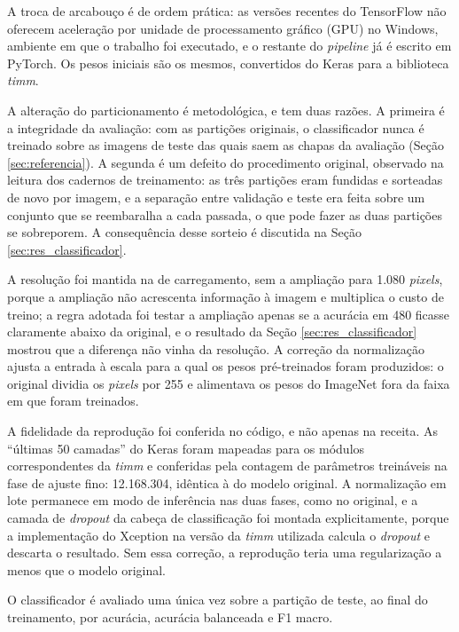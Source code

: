 A troca de arcabouço é de ordem prática: as versões recentes do TensorFlow não oferecem aceleração por unidade de processamento gráfico (GPU) no Windows, ambiente em que o trabalho foi executado, e o restante do \textit{pipeline} já é escrito em PyTorch. Os pesos iniciais são os mesmos, convertidos do Keras para a biblioteca \textit{timm}.

A alteração do particionamento é metodológica, e tem duas razões. A primeira é a integridade da avaliação: com as partições originais, o classificador nunca é treinado sobre as imagens de teste das quais saem as chapas da avaliação (Seção \ref{sec:referencia}). A segunda é um defeito do procedimento original, observado na leitura dos cadernos de treinamento: as três partições eram fundidas e sorteadas de novo por imagem, e a separação entre validação e teste era feita sobre um conjunto que se reembaralha a cada passada, o que pode fazer as duas partições se sobreporem. A consequência desse sorteio é discutida na Seção \ref{sec:res_classificador}.

A resolução foi mantida na de carregamento, sem a ampliação para 1.080 \textit{pixels}, porque a ampliação não acrescenta informação à imagem e multiplica o custo de treino; a regra adotada foi testar a ampliação apenas se a acurácia em 480 ficasse claramente abaixo da original, e o resultado da Seção \ref{sec:res_classificador} mostrou que a diferença não vinha da resolução. A correção da normalização ajusta a entrada à escala para a qual os pesos pré-treinados foram produzidos: o original dividia os \textit{pixels} por 255 e alimentava os pesos do ImageNet fora da faixa em que foram treinados.

A fidelidade da reprodução foi conferida no código, e não apenas na receita. As ``últimas 50 camadas'' do Keras foram mapeadas para os módulos correspondentes da \textit{timm} e conferidas pela contagem de parâmetros treináveis na fase de ajuste fino: 12.168.304, idêntica à do modelo original. A normalização em lote permanece em modo de inferência nas duas fases, como no original, e a camada de \textit{dropout} da cabeça de classificação foi montada explicitamente, porque a implementação do Xception na versão da \textit{timm} utilizada calcula o \textit{dropout} e descarta o resultado. Sem essa correção, a reprodução teria uma regularização a menos que o modelo original.

O classificador é avaliado uma única vez sobre a partição de teste, ao final do treinamento, por acurácia, acurácia balanceada e F1 macro.

